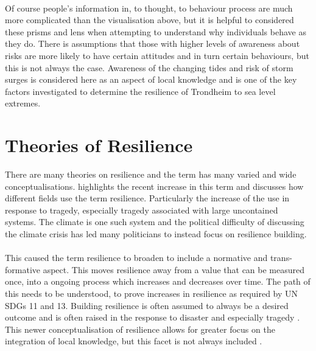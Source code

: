 \paragraph{}
Of course people's information in, to thought, to behaviour process are much more complicated than the visualisation above, but it is helpful to considered these prisms and lens when attempting to understand why individuals behave as they do. There is assumptions that those with higher levels of awareness about risks are more likely to have certain attitudes and in turn certain behaviours, but this is not always the case. \cite{lujala_climate_2015}  Awareness of the changing tides and risk of storm surges is considered here as an aspect of local knowledge and is one of the key factors investigated to determine the resilience of Trondheim to sea level extremes. 



\section{Theories of Resilience }

There are many theories on resilience and the term has many varied and wide conceptualisations. \cite{moser_turbulent_2019} highlights the recent increase in this term and discusses how different fields use the term resilience. Particularly the increase of the use in response to tragedy, especially tragedy associated with large uncontained systems. The climate is one such system and the political difficulty of discussing the climate crisis has led many politicians to instead focus on resilience building. 
\paragraph{}

This caused the term resilience to broaden to include a normative and trans-formative aspect.  This moves resilience away from a value that can be measured once, into a ongoing process which increases and decreases over time. The path of this needs to be understood, to prove increases in resilience as required by UN SDGs 11 and 13. Building resilience is often assumed to always be a desired outcome and is often raised in the response to disaster and especially tragedy \cite{moser_turbulent_2019}. This newer conceptualisation of resilience allows for greater focus on the integration of local knowledge, but this facet is not always included \cite{moser_turbulent_2019}.
\paragraph{}


